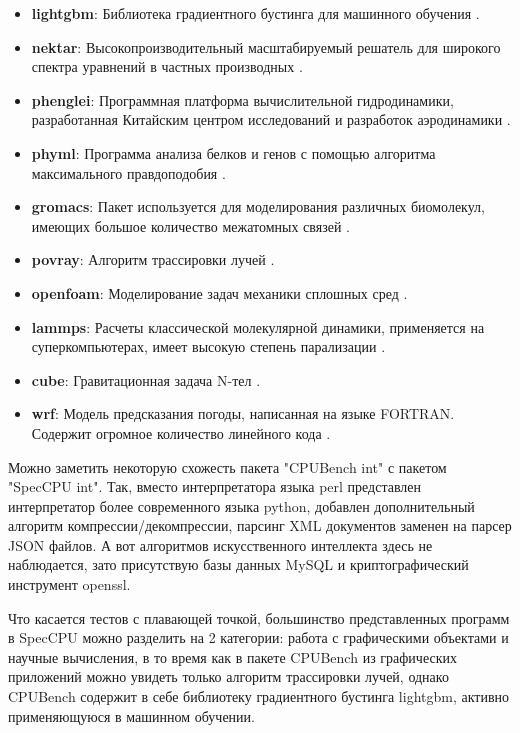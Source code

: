 \begin{itemize}
	\item  \textbf{lightgbm}: Библиотека градиентного бустинга для машинного обучения \cite{ke2017lightgbm}.
	\item  \textbf{nektar}: Высокопроизводительный масштабируемый решатель для широкого спектра уравнений в частных производных \cite{cantwell2015nektar++}.
	\item  \textbf{phenglei}: Программная платформа вычислительной гидродинамики, разработанная Китайским центром исследований и разработок аэродинамики \cite{zhao2020design}.
	\item  \textbf{phyml}: Программа анализа белков и генов с помощью алгоритма максимального правдоподобия \cite{guindon2010new}.
	\item  \textbf{gromacs}: Пакет используется для моделирования различных биомолекул, имеющих большое количество межатомных связей \cite{van2005gromacs}.
	\item  \textbf{povray}: Алгоритм трассировки лучей \cite{plachetka1998pov}.
	\item  \textbf{openfoam}: Моделирование задач механики сплошных сред \cite{jasak2009openfoam}. 
	\item  \textbf{lammps}: Расчеты классической молекулярной динамики, применяется на суперкомпьютерах, имеет высокую степень парализации \cite{gowthaman2023review}.
	\item  \textbf{cube}: Гравитационная задача N-тел \cite{yu2018cube}.
	\item  \textbf{wrf}: Модель предсказания погоды, написанная на языке FORTRAN. Содержит огромное количество линейного кода \cite{skamarock2019description}. 	        
\end{itemize}

Можно заметить некоторую схожесть пакета "CPUBench int"\phantom{} с пакетом "SpecCPU int"\phantom{}. Так, вместо интерпретатора языка perl представлен интерпретатор более современного языка python, добавлен дополнительный алгоритм компрессии/декомпрессии, парсинг XML документов заменен на парсер JSON файлов. А вот алгоритмов искусственного интеллекта здесь не наблюдается, зато присутствую базы данных MySQL и криптографический инструмент openssl.

Что касается тестов с плавающей точкой, большинство представленных программ в SpecCPU можно разделить на 2 категории: работа с графическими объектами и научные вычисления, в то время как в пакете CPUBench из графических приложений можно увидеть только алгоритм трассировки лучей, однако CPUBench содержит в себе библиотеку градиентного бустинга lightgbm, активно применяющуюся в машинном обучении. 

